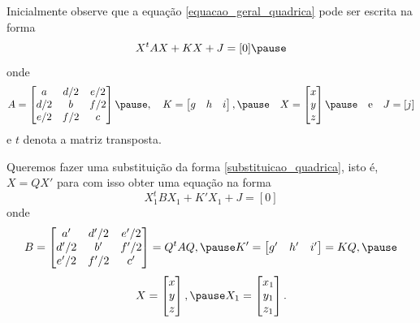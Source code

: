 \documentclass{beamer}
\begin{document}
\begin{frame}
    Inicialmente observe que a equação \eqref{equacao_geral_quadrica} \pause pode ser escrita na forma\pause
    \begin{equation}\label{equacao_matricial_quadrica}
        X^tAX + KX + J = [0]\pause
    \end{equation}
    onde
    \[
        A = \begin{bmatrix}
            a   & d/2 & e/2 \\
            d/2 & b   & f/2 \\
            e/2 & f/2 & c
        \end{bmatrix}\pause
        , \quad K = \begin{bmatrix}
            g & h & i
        \end{bmatrix}, \pause \quad X = \begin{bmatrix}
            x \\
            y \\
            z
        \end{bmatrix}\pause \quad\mbox{e}\quad J = [j]
    \]\pause
    e $t$ denota a matriz transposta.

\end{frame}

\begin{frame}
    Queremos fazer uma substituição da forma \eqref{substituicao_quadrica}, \pause isto é, $X = QX'$ \pause para com isso obter uma equação na forma\pause
    \[
        X_1^tBX_1 + K'X_1 + J = [0]
    \]\pause
    onde\pause
    \[
        B = \begin{bmatrix}
            a'   & d'/2 & e'/2 \\
            d'/2 & b'   & f'/2 \\
            e'/2 & f'/2 & c'
        \end{bmatrix} = Q^tAQ,\pause
        K' = \begin{bmatrix}
            g' & h' & i'
        \end{bmatrix} = KQ,\pause
    \]
    \[
        X = \begin{bmatrix}
            x \\y\\z
        \end{bmatrix},\pause
        X_1 = \begin{bmatrix}
            x_1 \\y_1\\z_1
        \end{bmatrix}.
    \]
\end{frame}
\end{document}
